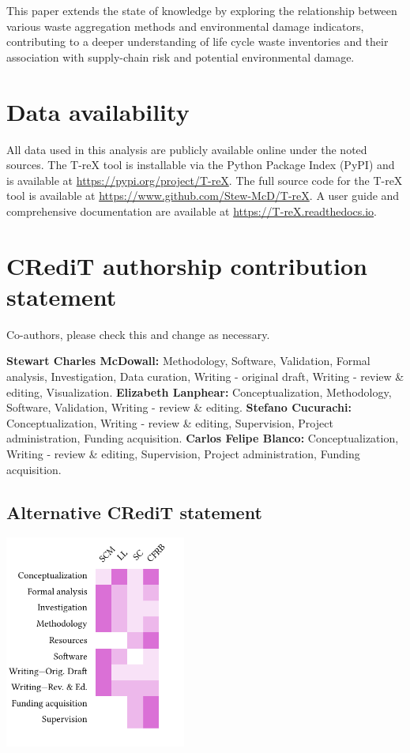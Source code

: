 \documentclass[review,3p,authoryear]{elsarticle}
\newcommand{\cbox}[1]{
    \begin{tcolorbox}[hbox, colback=red!5!white, colframe=red!65!black, boxrule=0.25pt, boxsep=2pt, left=2pt, right=2pt, top=1pt, bottom=1pt]
        \small\sffamily #1
    \end{tcolorbox}
}
\begin{document}
This paper extends the state of knowledge by exploring the relationship between various waste aggregation methods and environmental damage indicators, contributing to a deeper understanding of life cycle waste inventories and their association with supply-chain risk and potential environmental damage.


\section*{Data availability} 
All data used in this analysis are publicly available online under the noted sources. The T-reX tool is installable via the Python Package Index (PyPI) and is available at \url{https://pypi.org/project/T-reX}.
The full source code for the T-reX tool is available at \url{https://www.github.com/Stew-McD/T-reX}.
A user guide and comprehensive documentation are available at \url{https://T-reX.readthedocs.io}.

\section*{CRediT authorship contribution statement}
\cbox{Co-authors, please check this and change as necessary.}
\textbf{Stewart Charles McDowall:} Methodology, Software, Validation, Formal analysis, Investigation, Data curation, Writing - original draft, Writing - review \& editing, Visualization.
\textbf{Elizabeth Lanphear:} Conceptualization, Methodology, Software, Validation, Writing - review \& editing.
\textbf{Stefano Cucurachi:} Conceptualization, Writing - review \& editing, Supervision, Project administration, Funding acquisition.
\textbf{Carlos Felipe Blanco:} Conceptualization, Writing - review \& editing, Supervision, Project administration, Funding acquisition.

\subsection*{Alternative CRediT statement}

\includegraphics[width=\columnwidth, height=7cm, keepaspectratio]{credit.pdf}
\end{document}
